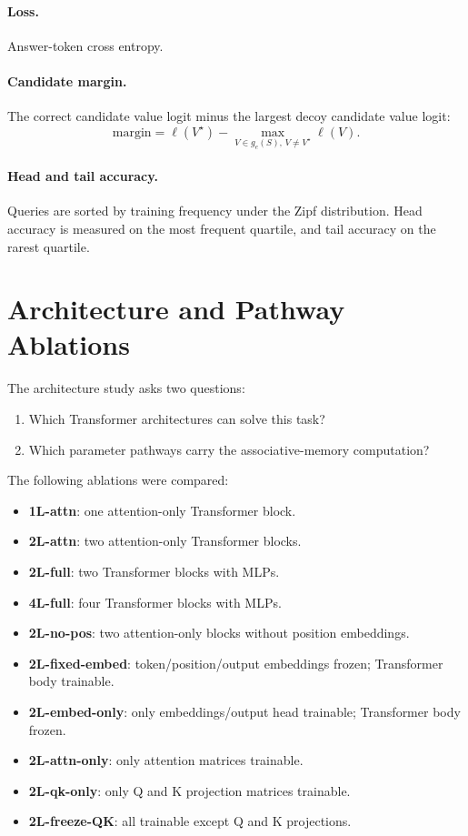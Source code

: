 \documentclass[11pt]{article}
\begin{document}
\paragraph{Loss.}
Answer-token cross entropy.

\paragraph{Candidate margin.}
The correct candidate value logit minus the largest decoy candidate value logit:
\[
\mathrm{margin}
=
\ell(V^\star) - \max_{V \in g_e(S),\, V\neq V^\star} \ell(V).
\]

\paragraph{Head and tail accuracy.}
Queries are sorted by training frequency under the Zipf distribution.
Head accuracy is measured on the most frequent quartile, and tail accuracy on the rarest quartile.

\section{Architecture and Pathway Ablations}

The architecture study asks two questions:
\begin{enumerate}
  \item Which Transformer architectures can solve this task?
  \item Which parameter pathways carry the associative-memory computation?
\end{enumerate}

The following ablations were compared:
\begin{itemize}
  \item \textbf{1L-attn}: one attention-only Transformer block.
  \item \textbf{2L-attn}: two attention-only Transformer blocks.
  \item \textbf{2L-full}: two Transformer blocks with MLPs.
  \item \textbf{4L-full}: four Transformer blocks with MLPs.
  \item \textbf{2L-no-pos}: two attention-only blocks without position embeddings.
  \item \textbf{2L-fixed-embed}: token/position/output embeddings frozen; Transformer body trainable.
  \item \textbf{2L-embed-only}: only embeddings/output head trainable; Transformer body frozen.
  \item \textbf{2L-attn-only}: only attention matrices trainable.
  \item \textbf{2L-qk-only}: only Q and K projection matrices trainable.
  \item \textbf{2L-freeze-QK}: all trainable except Q and K projections.
\end{itemize}
\end{document}
